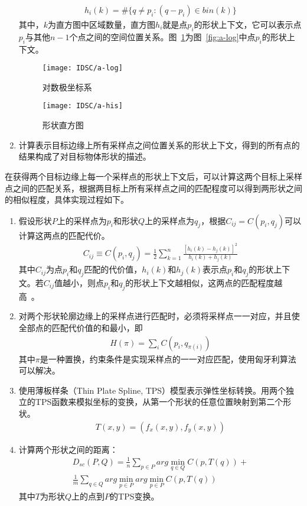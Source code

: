 \begin{enumerate}
  \begin{eqnarray}
  h_{i}(k) = \#\{q \ne p_{i} : (q-p_{i})\in bin(k)\}
  \end{eqnarray}
其中，$k$为直方图中区域数量，直方图$h_{i}$就是点$p_i$的形状上下文，它可以表示点$p_i$与其他$n-1$个点之间的空间位置关系。图~\ref{fig:a-his}为图~\ref{fig:a-log}中点$p_{i}$的形状上下文。
  \begin{figure}[H]
  \begin{minipage}{0.5\textwidth}
    \centering
    \texttt{[image: IDSC/a-log]}
    \caption{对数极坐标系}
    \label{fig:a-log}
  \end{minipage}\hfill
  \begin{minipage}{0.5\textwidth}
    \centering
    \texttt{[image: IDSC/a-his]}
    \caption{形状直方图}
    \label{fig:a-his}
  \end{minipage}
  \end{figure}
\item 计算表示目标边缘上所有采样点之间位置关系的形状上下文，得到的所有点的结果构成了对目标物体形状的描述。
\end{enumerate}

在获得两个目标边缘上每一个采样点的形状上下文后，可以计算这两个目标上采样点之间的匹配关系，根据两目标上所有采样点之间的匹配程度可以得到两形状之间的相似程度，具体实现过程如下。

\begin{enumerate}
\item 假设形状$P$上的采样点为$p_i$和形状$Q$上的采样点为$q_j$，根据$C_{ij}=C(p_i,q_j)$可以计算这两点的匹配代价。
  \begin{eqnarray}
  C_{ij} \equiv C(p_{i},q_{j}) = \frac{1}{2}\sum^{n}_{k=1}\frac{[h_{i}(k)-h_{j}(k)]^{2}}{h_{i}(k)+h_{j}(k)}
  \end{eqnarray}
  其中$C_{ij}$为点$p_i$和$q_j$匹配的代价值，$h_{i}(k)$和$h_{j}(k)$表示点$p_i$和$q_j$的形状上下文。若$C_{ij}$值越小，则点$p_i$和$q_j$的形状上下文越相似，这两点的匹配程度越高~\cite{杨小娜2013基于形状上下文的目标形状识别与匹配}。
\item 对两个形状轮廓边缘上的采样点进行匹配时，必须将采样点一一对应，并且使全部点的匹配代价值的和最小，即
  \begin{eqnarray}
  H(\pi) = \sum_{i}C(p_{i},q_{\pi(i)})
  \end{eqnarray}
  其中$\pi$是一种置换，约束条件是实现采样点的一一对应匹配，使用匈牙利算法可以解决。
\item 使用薄板样条（Thin Plate Spline, TPS）模型表示弹性坐标转换。用两个独立的TPS函数来模拟坐标的变换，从第一个形状的任意位置映射到第二个形状。
  \begin{eqnarray}
  T(x,y)=(f_{x}(x,y),f_{y}(x,y))
  \end{eqnarray}
\item 计算两个形状之间的距离：
  \begin{multline}
  D_{sc}(P,Q)=\frac{1}{n}\sum_{p\in P}arg \min_{q\in Q}C(p,T(q))+\\
  \frac{1}{m}\sum_{q\in Q}arg \min_{p\in P}arg \min_{p\in P}C(p,T(q))
  \end{multline}
  其中$T$为形状$Q$上的点到$P$的TPS变换。
\end{enumerate}

